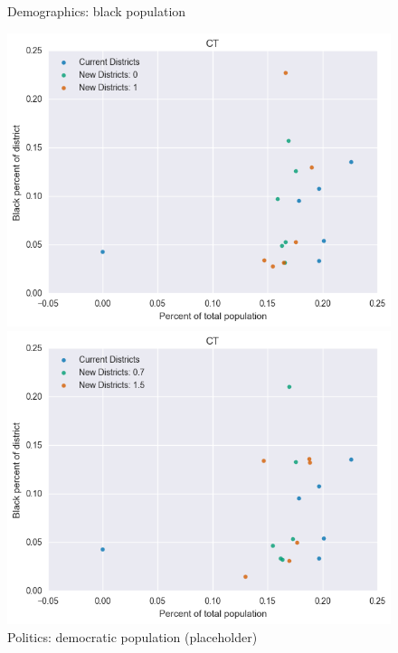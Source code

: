 \clearpage
\newpage

\begin{figure}[htb!] \centering
\caption{ Demographics: black population }
\includegraphics[width=4.5in]{../analysis/CT/analysis_scatter.png}
\caption{ Politics: democratic population (placeholder)}
\includegraphics[width=4.5in]{../analysis/CT/analysis_scatter2.png}
\end{figure}

\clearpage
\newpage


